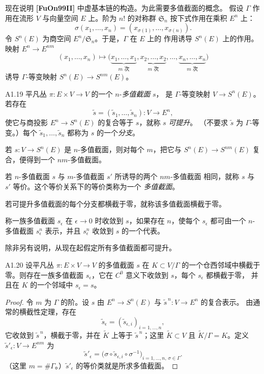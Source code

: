 现在说明 \textbf{[FuOn99II]} 中虚基本链的构造。为此需要多值截面的概念。
%
假设 $\Gamma$ 作用在流形 $V$ 与向量空间 $E$ 上。阶为 $n!$ 的对称群
$\mathfrak S_n$ 按下式作用在乘积 $E^n$ 上：
\[
 \sigma(x_1,\ldots,x_n)
 =(x_{\sigma(1)},\ldots,x_{\sigma(n)}).
\]
令 $S^n(E)$ 为商空间 $E^n/\mathfrak S_n$。于是，$\Gamma$ 在 $E$ 上的
作用诱导 $S^n(E)$ 上的作用。映射 $E^n\to E^{nm}$
\[
 (x_1,\ldots,x_n)\longmapsto
 \bigl(
 \underbrace{x_1,\ldots,x_1}_{m\text{ 次}},
 \underbrace{x_2,\ldots,x_2}_{m\text{ 次}},\ldots,
 \underbrace{x_n,\ldots,x_n}_{m\text{ 次}}
 \bigr)
\]
诱导 $\Gamma$-等变映射 $S^n(E)\to S^{nm}(E)$。

\begin{definition}{A1.19}\label{def:a1-19}
平凡丛 $\pi\colon E\times V\to V$ 的一个 $n$-\emph{多值截面} $s$，
是 $\Gamma$-等变映射 $V\to S^n(E)$。若存在
\[
 \widetilde s=(\widetilde s_1,\ldots,\widetilde s_n)\colon V\to E^n,
\]
使它与商投影 $E^n\to S^n(E)$ 的复合等于 $s$，就称 $s$ \emph{可提升}。
（不要求 $\widetilde s$ 为 $\Gamma$-等变。）每个
$\widetilde s_1,\ldots,\widetilde s_n$ 都称为 $s$ 的一个\emph{分支}。

若 $s\colon V\to S^n(E)$ 是 $n$-多值截面，则对每个 $m$，把它与
$S^n(E)\to S^{nm}(E)$ 复合，便得到一个 $nm$-多值截面。

若 $n$-多值截面 $s$ 与 $m$-多值截面 $s'$ 所诱导的两个 $nm$-多值截面
相同，就称 $s$ 与 $s'$ 等价。这个等价关系下的等价类称为一个
\emph{多值截面}。

若可提升多值截面的每个分支都横截于零，就称该多值截面横截于零。

称一族多值截面 $s_\epsilon$ 在 $\epsilon\to0$ 时收敛到 $s$，如果存在
$n$，使每个 $s_\epsilon$ 都可由一个 $n$-多值截面
$s_\epsilon^n$ 表示，并且 $s_\epsilon^n$ 收敛到 $s$ 的一个代表。
\end{definition}

除非另有说明，从现在起假定所有多值截面都可提升。

\begin{lemma}{A1.20}\label{lem:a1-20}
设平凡丛 $\pi\colon E\times V\to V$ 的多值截面 $s$ 在
$K\subset V/\Gamma$ 的一个仓西邻域中横截于零。则存在一族多值截面
$s_\epsilon$，它在 $C^0$ 意义下收敛到 $s$，每个 $s_\epsilon$ 都横截于零，
并且在 $K$ 的一个邻域中 $s_\epsilon=s$。
\end{lemma}
\begin{proof}
令 $m$ 为 $\Gamma$ 的阶。设 $s$ 由
$E^n\to S^n(E)$ 与 $\widetilde s^{\,n}\colon V\to E^n$ 的复合表示。
由通常的横截性定理，存在
\[
 \widetilde s_\epsilon
 =(\widetilde s_{\epsilon,i})_{i=1,\ldots,n},
\]
它收敛到 $\widetilde s^{\,n}$，横截于零，并在 $\widetilde K$ 上等于
$\widetilde s^{\,n}$；这里 $\widetilde K\subset V$ 且
$\widetilde K/\Gamma=K$。定义 $\widetilde s'_\epsilon\colon V\to E^{nm}$ 为
\[
 \widetilde s'_\epsilon
 =\bigl(
   \sigma\circ\widetilde s_{\epsilon,i}\circ\sigma^{-1}
  \bigr)_{i=1,\ldots,n,\,\sigma\in\Gamma}.
\]
（这里 $m=\#\Gamma$。）$\widetilde s'_\epsilon$ 的等价类就是所求多值截面。
\end{proof}

